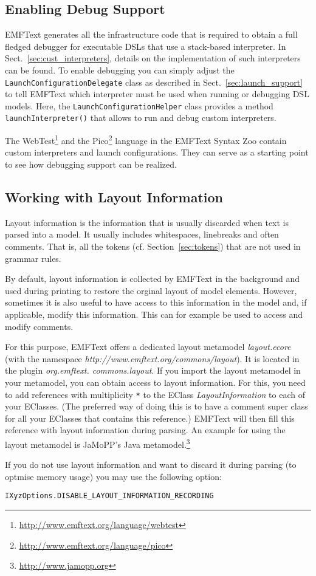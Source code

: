 \subsection{Enabling Debug Support}

EMFText generates all the infrastructure code that is required to obtain a
full fledged debugger for executable DSLs that use a stack-based interpreter.
In Sect.~\ref{sec:cust_interpreters}, details on the implementation of such
interpreters can be found. To enable debugging you can simply adjust the 
\texttt{LaunchConfigurationDelegate} class as described in
Sect.~\ref{sec:launch_support} to tell EMFText which interpreter must be used
when running or debugging DSL models. Here, the
\texttt{LaunchConfigurationHelper} class provides a method
\texttt{launchInterpreter()} that allows to run and debug custom interpreters.

The WebTest\footnote{\url{http://www.emftext.org/language/webtest}} and the
Pico\footnote{\url{http://www.emftext.org/language/pico}} language in the
EMFText Syntax Zoo contain custom interpreters and launch configurations. They
can serve as a starting point to see how debugging support can be realized.

\subsection{Working with Layout Information}

Layout information is the information that is usually discarded when text
is parsed into a model. It usually includes whitespaces, linebreaks and often
comments. That is, all the tokens (cf. Section~\ref{sec:tokens}) that are not
used in grammar rules.

By default, layout information is collected by EMFText in the background
and used during printing to restore the orginal layout of model elements.
However, sometimes it is also useful to have access to this information
in the model and, if applicable, modify this information. This can for 
example be used to access and modify comments.

For this purpose, EMFText offers a dedicated layout metamodel 
\emph{layout.ecore} 
(with the namespace \emph{http://www.emftext.org/commons/layout}).
It is located in the plugin
\emph{org.emftext. commons.layout}.
If you import the layout metamodel in your metamodel, you can obtain access
to layout information. For this, you need to add references with multiplicity
\texttt{*} to the EClass \emph{LayoutInformation} to each of your EClasses.
(The preferred way of doing this is to have a comment super class for all your
EClasses that contains this reference.) EMFText will then fill this reference with
layout information during parsing. An example for using the layout metamodel
is JaMoPP's Java metamodel.\footnote{\url{http://www.jamopp.org}}

If you do not use layout information and want to discard it during parsing (to
optmise memory usage) you may use the following option:
\lstset{language=Java}
\begin{lstlisting}
IXyzOptions.DISABLE_LAYOUT_INFORMATION_RECORDING
\end{lstlisting}
